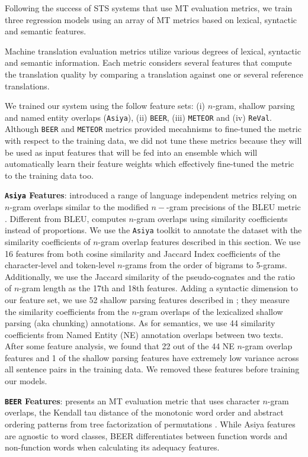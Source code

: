 Following the success of STS systems that use MT evaluation metrics, we train three regression models using an array of MT metrics based on lexical, syntactic and semantic features. 

Machine translation evaluation metrics utilize various degrees of lexical, syntactic and semantic information. Each metric considers several features that compute the translation quality by comparing a translation against one or several reference translations. 

We trained our system using the follow feature sets: (i) $n$-gram, shallow parsing and named entity overlaps ({\tt Asiya}), (ii) {\tt BEER}, (iii) {\tt METEOR} and (iv) {\tt ReVal}. Although {\tt BEER} and {\tt METEOR} metrics provided mecahnisms to fine-tuned the metric with respect to the training data, we did not tune these metrics because they will be used as input features that will be fed into an ensemble which will automatically learn their feature weights which effectively fine-tuned the metric to the training data too. 

\textbf{{\tt Asiya} Features}: \cite{gonzalez2014} introduced a range of language independent metrics relying on $n$-gram overlaps similar to the modified $n-$-gram precisions of the BLEU metric \citep{Papineni2002}. Different from BLEU, \cite{gonzalez2014} computes $n$-gram overlaps using similarity coefficients instead of proportions. We use the {\tt Asiya} toolkit \citep{Gimenez2010} to annotate the dataset with the similarity coefficients of $n$-gram overlap features described in this section. We use 16 features from both cosine similarity and Jaccard Index coefficients of the character-level and token-level $n$-grams from the order of bigrams to 5-grams. Additionally, we use the Jaccard similarity of the pseudo-cognates and the ratio of $n$-gram length as the 17th and 18th features. Adding a syntactic dimension to our feature set, we use 52 shallow parsing features described in \cite{usaarsheff2015}; they measure the similarity coefficients from the $n$-gram overlaps of the lexicalized shallow parsing (aka chunking) annotations. As for semantics, we use 44 similarity coefficients from Named Entity (NE) annotation overlaps between two texts. After some feature analysis, we found that 22 out of the 44 NE $n$-gram overlap features and 1 of the shallow parsing features have extremely low variance across all sentence pairs in the training data. We removed these features before training our models.

\textbf{{\tt BEER} Features}: \cite{stanojevic2014beer} presents an MT evaluation metric that uses character $n$-gram overlaps, the Kendall tau distance of the monotonic word order \citep{isozaki2010automatic,birch2010lrscore} and abstract ordering patterns from tree factorization of permutations \citep{zhang2007factorization}. While Asiya features are agnostic to word classes, BEER differentiates between function words and non-function words when calculating its adequacy features. 


